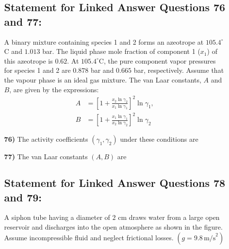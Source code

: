 \documentclass[journal,12pt,onecolumn]{IEEEtran}
\theoremstyle{remark}
\begin{document}
\begin{enumerate}
\begin{enumerate}
\subsection*{Statement for Linked Answer Questions 76 and 77:}
A binary mixture containing species 1 and 2 forms an azeotrope at $105.4^\circ$C and $1.013$ bar. The liquid phase mole fraction of component 1 ($x_1$) of this azeotrope is $0.62$. At $105.4^\circ$C, the pure component vapor pressures for species 1 and 2 are $0.878$ bar and $0.665$ bar, respectively. Assume that the vapour phase is an ideal gas mixture. The van Laar constants, $A$ and $B$, are given by the expressions:
\[\begin{aligned}A &= \left[ 1 + \frac{x_2 \ln \gamma_2}{x_1 \ln \gamma_1} \right]^2 \ln \gamma_1, \\B &= \left[ 1 + \frac{x_1 \ln \gamma_1}{x_2 \ln \gamma_2} \right]^2 \ln \gamma_2\end{aligned}\]

    \item[\textbf{76)}] The activity coefficients $(\gamma_1, \gamma_2)$ under these conditions are
    \hfill{}
    \begin{enumerate}
    \end{enumerate}
    \item[\textbf{77)}] The van Laar constants $(A, B)$ are
    \hfill{}
    \begin{enumerate}
    \end{enumerate}

\subsection*{Statement for Linked Answer Questions 78 and 79:}
A siphon tube having a diameter of $2$ cm draws water from a large open reservoir and discharges into the open atmosphere as shown in the figure. Assume incompressible fluid and neglect frictional losses. \quad $(g = 9.8 \, \text{m/s}^2)$


\end{enumerate}
\end{enumerate}
\end{document}
